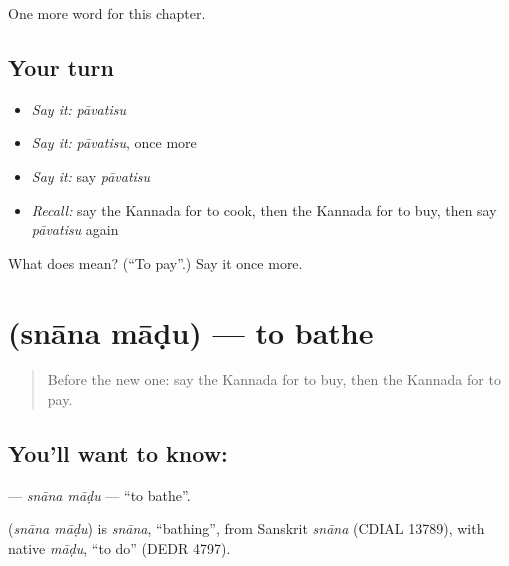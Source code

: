 \begin{grammarlens}[title={What you've built}]
One more word for this chapter.
\end{grammarlens}

\subsection*{Your turn}
\begin{itemize}
\raggedright
  \item \emph{Say it:} \emph{pāvatisu}
  \item \emph{Say it:} \emph{pāvatisu}, once more
  \item \emph{Say it:} say \emph{pāvatisu}
  \item \emph{Recall:} say the Kannada for to cook, then the Kannada for to buy, then say \emph{pāvatisu} again
\end{itemize}

\begin{tcolorbox}[breakable,colback=teal!4,colframe=teal!35!black,title={Before you move on}]
What does  mean? (\textquotedblleft{}To pay\textquotedblright{}.) Say it once more.
\end{tcolorbox}
\section[\texorpdfstring{\kn{ಸ್ನಾನ} \kn{ಮಾಡು} (snāna māḍu)}{ಸ್ನಾನ ಮಾಡು (snāna māḍu)}]{  (snāna māḍu) — to bathe}

\label{lesson:KA-C158-snana-madu}



\begin{quote}
Before the new one: say the Kannada for to buy, then the Kannada for to pay.
\end{quote}

\subsection*{You'll want to know:  }
\textbf{ } — \emph{snāna māḍu} — \textquotedblleft{}to bathe\textquotedblright{}.

\begin{cousinweb}
\textbf{ } (\emph{snāna māḍu}) is \emph{snāna}, \textquotedblleft{}bathing\textquotedblright{}, from Sanskrit \emph{snāna} (CDIAL 13789), with native \emph{māḍu}, \textquotedblleft{}to do\textquotedblright{} (DEDR 4797).
\end{cousinweb}

